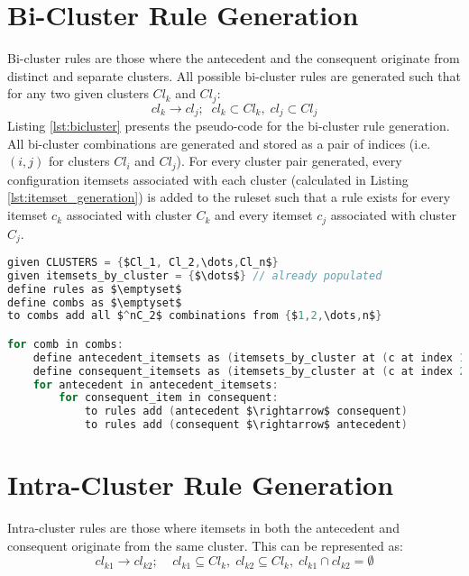 \section{Bi-Cluster Rule Generation}
\label{sec:bicluster}
Bi-cluster rules are those where the antecedent and the consequent originate from distinct and separate clusters. All possible bi-cluster rules are generated such that for any two given clusters $Cl_k$ and $Cl_j$:
\[
cl_k \rightarrow cl_j;\;\; cl_k \subset Cl_k, \; cl_j \subset Cl_j
\]
Listing \ref{lst:bicluster} presents the pseudo-code for the bi-cluster rule generation. All bi-cluster combinations are generated and stored as a pair of indices (i.e. $(i,j)$ for clusters $Cl_i$ and $Cl_j$). For every cluster pair generated, every configuration itemsets associated with each cluster (calculated in Listing \ref{lst:itemset_generation}) is added to the ruleset such that a rule exists for every itemset $c_k$ associated with cluster $C_k$ and every itemset $c_j$ associated with cluster $C_j$.

\begin{minipage}{\linewidth}
\begin{lstlisting}[language=C, mathescape=true, caption=Bi-Cluster Rule Generation, label=lst:bicluster]
given CLUSTERS = {$Cl_1, Cl_2,\dots,Cl_n$}
given itemsets_by_cluster = {$\dots$} // already populated
define rules as $\emptyset$
define combs as $\emptyset$
to combs add all $^nC_2$ combinations from {$1,2,\dots,n$}

for comb in combs:
    define antecedent_itemsets as (itemsets_by_cluster at (c at index 1)) // first index is 1
    define consequent_itemsets as (itemsets_by_cluster at (c at index 2))
    for antecedent in antecedent_itemsets:
        for consequent_item in consequent:
            to rules add (antecedent $\rightarrow$ consequent)
            to rules add (consequent $\rightarrow$ antecedent)
\end{lstlisting}
\end{minipage}

\section{Intra-Cluster Rule Generation}
\label{sec:intracluster}
Intra-cluster rules are those where itemsets in both the antecedent and consequent originate from the same cluster. This can be represented as:
\[
cl_{k1} \rightarrow cl_{k2}; \;\;\;\; cl_{k1} \subseteq Cl_k,\; cl_{k2} \subseteq Cl_k,\; cl_{k1} \cap cl_{k2} = \emptyset
\]

